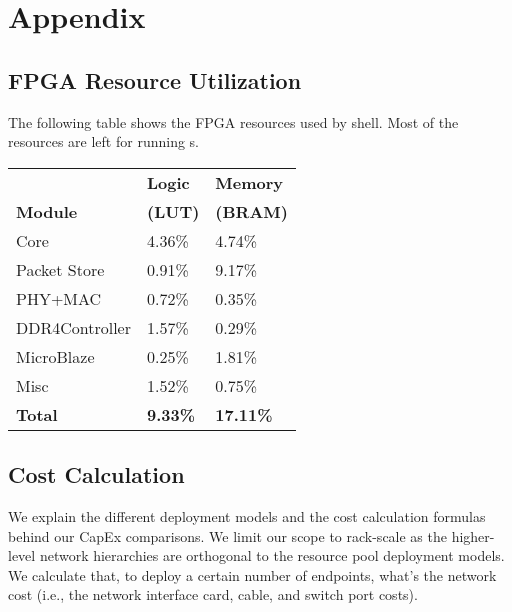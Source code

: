 
\clearpage

\appendix

\section{Appendix}

\subsection{FPGA Resource Utilization}

The following table shows the FPGA resources used by \snic{} shell.
Most of the resources are left for running \nt{}s.

\begin{center}
\scriptsize
\begin{tabular}{ p{0.6in} | p{0.2in} |p{0.27in} }
 & \textbf{Logic} & \textbf{Memory} \\
\textbf{Module} & \textbf{(LUT)} & \textbf{(BRAM)} \\
\hline
\hline
\snic{} Core & 4.36\%   & 4.74\% \\
Packet Store & 0.91\%   & 9.17\% \\
PHY+MAC      & 0.72\%   & 0.35\% \\
DDR4Controller         & 1.57\%   & 0.29\% \\
MicroBlaze   & 0.25\%   & 1.81\% \\
Misc         & 1.52\%   & 0.75\% \\
\hline
\textbf{Total}        & \textbf{9.33\%}   & \textbf{17.11\%} \\
\end{tabular}
\end{center}



\subsection{Cost Calculation}
We explain the different deployment models and the cost calculation formulas behind our CapEx comparisons.
We limit our scope to rack-scale as the higher-level network hierarchies
are orthogonal to the resource pool deployment models.
We calculate that, to deploy a certain number of endpoints, what's the
network cost (i.e., the network interface card, cable, and switch port costs).

